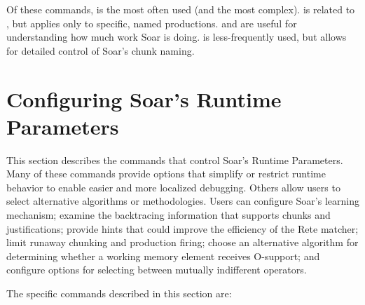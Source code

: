 Of these commands,  is the most often used (and the most 
complex).  is related to , but applies only 
to specific, named productions.  and  
are useful for understanding how much work Soar is doing.  is less-frequently
used, but allows for detailed control of Soar's chunk naming.










\section{Configuring Soar's Runtime Parameters}
\label{RUNTIME}

This section describes the commands that control Soar's Runtime Parameters.
Many of these commands provide options that simplify or restrict 
runtime behavior to enable easier and more localized debugging.
Others allow users to select alternative algorithms or methodologies.
Users can configure Soar's learning mechanism; examine the
backtracing information that supports chunks and justifications;
provide hints that could improve the efficiency of the Rete matcher;
limit runaway chunking and production firing;
choose an alternative algorithm for determining whether a working memory
element receives O-support;  and 
configure options for selecting between mutually indifferent operators.

The specific commands described in this section are:

